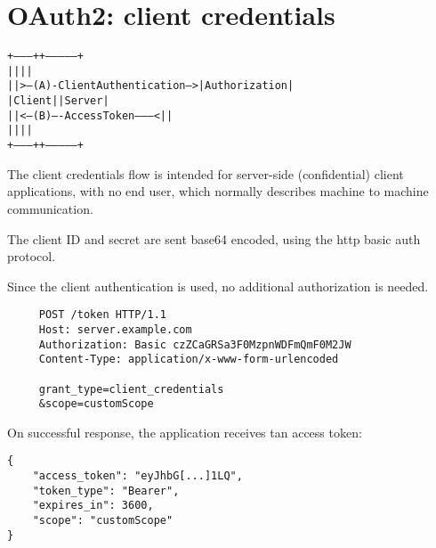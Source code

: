 \section{OAuth2: client credentials}
\label{sec:client-credentials}
\begin{alltt}
     +---------+                                  +---------------+
     |         |                                  |               |
     |         |>--(A)- Client Authentication --->| Authorization |
     | Client  |                                  |     Server    |
     |         |<--(B)---- Access Token ---------<|               |
     |         |                                  |               |
     +---------+                                  +---------------+
\end{alltt}
The client credentials flow is intended for server-side (confidential) client
applications, with no end user, which normally describes machine to machine
communication.

The client ID and secret are sent base64 encoded, using the http basic
auth protocol.

Since the client authentication is used, no additional authorization is needed.

\begin{lstlisting}
     POST /token HTTP/1.1
     Host: server.example.com
     Authorization: Basic czZCaGRSa3F0MzpnWDFmQmF0M2JW
     Content-Type: application/x-www-form-urlencoded

     grant_type=client_credentials
     &scope=customScope
\end{lstlisting}

On successful response, the application receives tan access token:
\begin{lstlisting}
{
    "access_token": "eyJhbG[...]1LQ",
    "token_type": "Bearer",
    "expires_in": 3600,
    "scope": "customScope"
}
\end{lstlisting}

